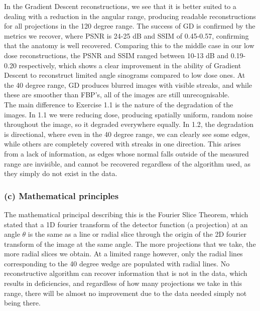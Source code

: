 \documentclass[11pt, a4paper]{article}
\begin{document}
\noindent In the Gradient Descent reconstructions, we see that it is better suited to a dealing with a reduction in the angular range, producing readable reconstructions for all projections in the 120 degree range. 
The success of GD is confirmed by the metrics we recover, where PSNR is 24-25 dB and SSIM of 0.45-0.57, confirming that the anatomy is well recovered. 
Comparing this to the middle case in our low dose reconstructions, the PSNR and SSIM ranged between 10-13 dB and 0.19-0.20 respectively, which shows a clear improvement in the ability of Gradient Descent to reconstruct limited angle sinograms compared to low dose ones. 
At the 40 degree range, GD produces blurred images with visible streaks, and while these are smoother than FBP's, all of the images are still unrecognisable. \\ 

\noindent The main difference to Exercise 1.1 is the nature of the degradation of the images. 
In 1.1 we were reducing dose, producing spatially uniform, random noise throughout the image, so it degraded everywhere equally. 
In 1.2, the degradation is directional, where even in the 40 degree range, we can clearly see some edges, while others are completely covered with streaks in one direction. 
This arises from a lack of information, as edges whose normal falls outside of the measured range are invisible, and cannot be recovered regardless of the algorithm used, as they simply do not exist in the data. \\

\subsubsection*{(c) Mathematical principles}

The mathematical principal describing this is the Fourier Slice Theorem, which stated that a 1D fourier transform of the detector function (a projection) at an angle $\theta$ is the same as a line or radial slice through the origin of the 2D fourier transform of the image at the same angle. 
The more projections that we take, the more radial slices we obtain.
At a limited range however, only the radial lines corresponding to the 40 degree wedge are populated with radial lines. 
No reconstructive algorithm can recover information that is not in the data, which results in deficiencies, and regardless of how many projections we take in this range, there will be almost no improvement due to the data needed simply not being there. \\
\end{document}
